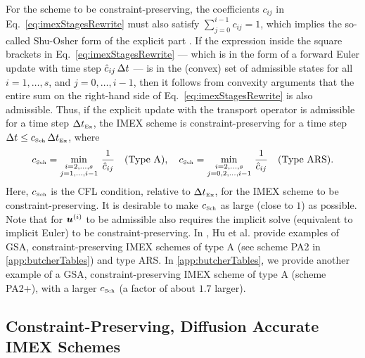 For the scheme to be constraint-preserving, the coefficients $c_{ij}$ in Eq.~\eqref{eq:imexStagesRewrite} must also satisfy $\sum_{j=0}^{i-1}c_{ij}=1$, which implies the so-called Shu-Osher form of the explicit part \cite{shuOsher_1988}.  
If the expression inside the square brackets in Eq.~\eqref{eq:imexStagesRewrite} --- which is in the form of a forward Euler update with time step $\hat{c}_{ij}\,\Delta t$ --- is in the (convex) set of admissible states for all $i=1,\ldots,s$, and $j=0,\ldots,i-1$, then it follows from convexity arguments that the entire sum on the right-hand side of Eq.~\eqref{eq:imexStagesRewrite} is also admissible.  
Thus, if the explicit update with the transport operator is admissible for a time step $\Delta t_{\mbox{\tiny Ex}}$, the IMEX scheme is constraint-preserving for a time step $\Delta t\le c_{\mbox{\tiny Sch}}\,\Delta t_{\mbox{\tiny Ex}}$, where
\begin{equation}
  c_{\mbox{\tiny Sch}}=\min_{\substack{i = 2,\ldots,s \\ 
       j = 1,\ldots,i-1}}\,\frac{1}{\hat{c}_{ij}} \quad \text{(Type A)}, \quad  c_{\mbox{\tiny Sch}}=\min_{\substack{i = 2,\ldots,s \\ 
              j = 0,2,\ldots,i-1}}\,\frac{1}{\hat{c}_{ij}} \quad \text{(Type ARS)}.
  \label{eq:imexCFL}
\end{equation}
Here, $c_{\mbox{\tiny Sch}}$ is the CFL condition, relative to $\Delta t_{\mbox{\tiny Ex}}$, for the IMEX scheme to be constraint-preserving.  
It is desirable to make $c_{\mbox{\tiny Sch}}$ as large (close to $1$) as possible.  
Note that for $\boldsymbol{u}^{(i)}$ to be admissible also requires the implicit solve (equivalent to implicit Euler) to be constraint-preserving.  
In \cite{hu_etal_2018}, Hu et al. provide examples of GSA, constraint-preserving IMEX schemes of type A (see scheme PA2 in \ref{app:butcherTables}) and type ARS.  
In \ref{app:butcherTables}, we provide another example of a GSA, constraint-preserving IMEX scheme of type A (scheme PA2+), with a larger $c_{\mbox{\tiny Sch}}$ (a factor of about $1.7$ larger).  

\subsection{Constraint-Preserving, Diffusion Accurate IMEX Schemes}

